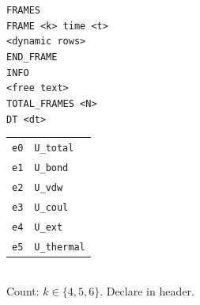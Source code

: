 \documentclass[12pt, a4paper, oneside]{article}
\begin{document}
\begin{tcolorbox}
\begin{multicols}{2}
\begin{tcolorbox}
\texttt{FRAMES}\\

\texttt{FRAME <k> time <t>}\\

\texttt{<dynamic rows>}\\

\texttt{END\_FRAME}\\[4pt]

\texttt{INFO}\\

\texttt{<free text>}\\

\texttt{TOTAL\_FRAMES <N>}\\

\texttt{DT <dt>}

\end{tcolorbox}


\medskip


\begin{tcolorbox}[

  colback=okgreenlight, colframe=okgreen,

  boxrule=0.7pt, arc=3pt, left=4pt, right=4pt, top=3pt, bottom=3pt,

  title={\bfseries\small Energy Layers},

  fonttitle=\small\bfseries, attach title to upper, after title={\\[2pt]}

]

\small

\begin{tabular}{ll}

\texttt{e0} & \texttt{U\_total} \\

\texttt{e1} & \texttt{U\_bond} \\

\texttt{e2} & \texttt{U\_vdw} \\

\texttt{e3} & \texttt{U\_coul} \\

\texttt{e4} & \texttt{U\_ext} \\

\texttt{e5} & \texttt{U\_thermal} \\

\end{tabular}\\[4pt]

Count: $k \in \{4, 5, 6\}$.  Declare in header.\\


\end{tcolorbox}
\end{multicols}
\end{tcolorbox}
\end{document}
